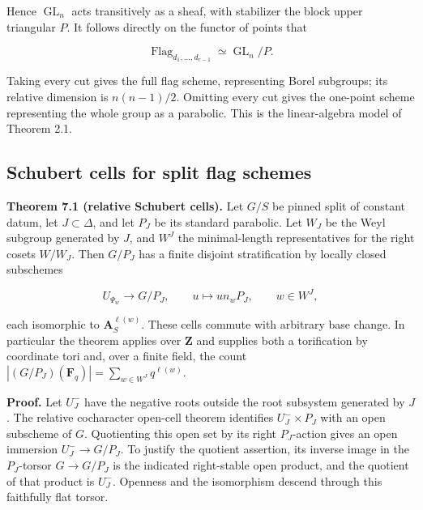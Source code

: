 \documentclass[11pt,a4paper,openany]{report}
\begin{document}
Hence \(\operatorname{GL}_n\) acts transitively as a sheaf, with stabilizer the block upper triangular \(P\). It follows directly on the functor of points that

\[
\operatorname{Flag}_{d_1,\ldots,d_{r-1}}\simeq\operatorname{GL}_n/P.
\tag{7.2}
\]

Taking every cut gives the full flag scheme, representing Borel subgroups; its relative dimension is \(n(n-1)/2\). Omitting every cut gives the one-point scheme representing the whole group as a parabolic. This is the linear-algebra model of Theorem 2.1.

\subsection{Schubert cells for split flag schemes}\label{AG-RG-06-schubert-cells-for-split-flag-schemes}

\textbf{Theorem 7.1 (relative Schubert cells).} Let \(G/S\) be pinned split of constant datum, let \(J\subset\Delta\), and let \(P_J\) be its standard parabolic. Let \(W_J\) be the Weyl subgroup generated by \(J\), and \(W^J\) the minimal-length representatives for the right cosets \(W/W_J\). Then \(G/P_J\) has a finite disjoint stratification by locally closed subschemes

\[
U_{\Psi_w}\longrightarrow G/P_J,\qquad u\longmapsto un_wP_J,
\qquad w\in W^J,
\]

each isomorphic to \(\mathbf A_S^{\ell(w)}\). These cells commute with arbitrary base change. In particular the theorem applies over \(\mathbf Z\) and supplies both a torification by coordinate tori and, over a finite field, the count \(|(G/P_J)(\mathbf F_q)|=\sum_{w\in W^J}q^{\ell(w)}\).

\textbf{Proof.} Let \(U_J^-\) have the negative roots outside the root subsystem generated by \(J\). The relative cocharacter open-cell theorem identifies \(U_J^-\times P_J\) with an open subscheme of \(G\). Quotienting this open set by its right \(P_J\)-action gives an open immersion \(U_J^-\to G/P_J\). To justify the quotient assertion, its inverse image in the \(P_J\)-torsor \(G\to G/P_J\) is the indicated right-stable open product, and the quotient of that product is \(U_J^-\). Openness and the isomorphism descend through this faithfully flat torsor.
\end{document}
